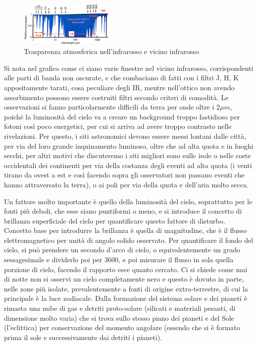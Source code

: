 \documentclass[a4paper,twoside,openany,notitlepage]{book}
\theoremstyle{definition}
\theoremstyle{plain}
\begin{document}
\begin{figure}
	\vspace{-8pt} %
	\centering
	\includegraphics[width=0.4\textwidth]{./Immagini/Capitolo1/trasparenza_atm_IR.png}
	\vspace{-5pt}
	\caption*{Trasparenza atmosferica nell'infrarosso e vicino infrarosso}
	\vspace{-8pt}
\end{figure}

Si nota nel grafico come ci siano varie finestre nel vicino infrarosso, corrispondenti alle parti di banda non oscurate, e che combaciano di fatti con i filtri J, H, K appositamente tarati, cosa peculiare degli IR, mentre nell'ottico non avendo assorbimento possono essere costruiti filtri secondo criteri di comodità. Le osservazioni si fanno particolarmente difficili da terra per onde oltre i $2\mu m$, poiché la luminosità del cielo va a creare un background troppo fastidioso per fotoni così poco energetici, per cui si arriva ad avere troppo contrasto nelle rivelazioni. Per questo, i siti astronomici devono essere messi lontani dalle città, per via del loro grande inquinamento luminoso, oltre che ad alta quota e in luoghi secchi, per altri motivi che discuteremo i siti migliori sono sulle isole o nelle coste occidentali dei continenti per via della costanza degli eventi ad alta quota (i venti tirano da ovest a est e così facendo sopra gli osservatori non passano eventi che hanno attraversato la terra), o ai poli per via della quota e dell'aria molto secca.

Un fattore molto importante è quello della luminosità del cielo, soprattutto per le fonti più deboli, che esse siano puntiformi o meno, e si introduce il concetto di brillanza superficiale del cielo per quantificare questo fattore di disturbo. Concetto base per introdurre la brillanza è quella di magnitudine, che è il flusso elettromagnetico per unità di angolo solido osservato. Per quantificare il fondo del cielo, si può prendere un secondo d'arco di cielo, o equivalentemente un grado sessagesimale e dividerlo poi per 3600, e poi misurare il flusso in sola quella porzione di cielo, facendo il rapporto esce quanto cercato. Ci si chiede come mai di notte non si osservi un cielo completamente nero e questo è dovuto in parte, nelle zone più isolate, prevalentemente a fonti di origine extra-terrestre, di cui la principale è la luce zodiacale. Dalla formazione del sistema solare e dei pianeti è rimasta una nube di gas e detriti proto-solare (silicati e materiali pesanti, di dimensione molto varia) che si trova sullo stesso piano dei pianeti e del Sole (l'eclittica) per conservazione del momento angolare (essendo che si è formato prima il sole e successivamente dai detriti i pianeti).
\end{document}
